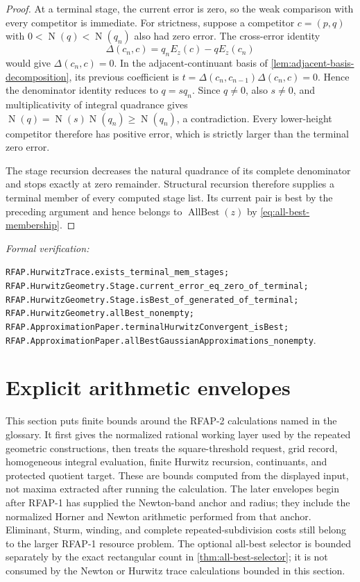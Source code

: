 \documentclass[11pt]{article}
\newcommand{\Norm}[1]{\operatorname{N}\!\left(#1\right)}
\newcommand{\leanref}[1]{\par\smallskip\noindent
  \emph{Formal verification:}\par\nobreak
  {\raggedright\nolinkurl{#1}.\par}}
\begin{document}
\begin{proof}
At a terminal stage, the current error is zero, so the weak comparison with
every competitor is immediate.  For strictness, suppose a competitor
$c=(p,q)$ with $0<\Norm q<\Norm{q_n}$ also had zero error.  The cross-error
identity
\[
 \Delta(c_n,c)=q_nE_z(c)-qE_z(c_n)
\]
would give $\Delta(c_n,c)=0$.  In the adjacent-continuant basis of
\cref{lem:adjacent-basis-decomposition}, its previous coefficient is
$t=\Delta(c_n,c_{n-1})\Delta(c_n,c)=0$.  Hence the denominator identity
reduces to $q=sq_n$.  Since $q\ne0$, also $s\ne0$, and multiplicativity of
integral quadrance gives $\Norm q=\Norm s\Norm{q_n}\ge\Norm{q_n}$, a
contradiction.  Every lower-height competitor therefore has positive error,
which is strictly larger than the terminal zero error.

The stage recursion decreases the natural quadrance of its complete
denominator and stops exactly at zero remainder.  Structural recursion
therefore supplies a terminal member of every computed stage list.  Its
current pair is best by the preceding argument and hence belongs to
$\operatorname{AllBest}(z)$ by
\eqref{eq:all-best-membership}.
\end{proof}

\leanref{RFAP.HurwitzTrace.exists_terminal_mem_stages;
RFAP.HurwitzGeometry.Stage.current_error_eq_zero_of_terminal;
RFAP.HurwitzGeometry.Stage.isBest_of_generated_of_terminal;
RFAP.HurwitzGeometry.allBest_nonempty;
RFAP.ApproximationPaper.terminalHurwitzConvergent_isBest;
RFAP.ApproximationPaper.allBestGaussianApproximations_nonempty}

\section{Explicit arithmetic envelopes}
\label{sec:arithmetic-envelopes}

This section puts finite bounds around the RFAP-2 calculations named in the
glossary.  It first gives the normalized rational working layer used by the
repeated geometric constructions, then treats the square-threshold request,
grid record, homogeneous integral evaluation, finite Hurwitz recursion,
continuants, and protected quotient target.  These are bounds computed from
the displayed input, not maxima extracted after running the calculation.
The later envelopes begin after RFAP-1 has supplied the Newton-band anchor and
radius; they include the normalized Horner and Newton arithmetic performed
from that anchor.  Eliminant, Sturm, winding, and complete
repeated-subdivision costs still belong to the larger RFAP-1 resource problem.
The optional all-best selector is bounded separately by the exact rectangular
count in \cref{thm:all-best-selector}; it is not consumed by the Newton or
Hurwitz trace calculations bounded in this section.
\end{document}
